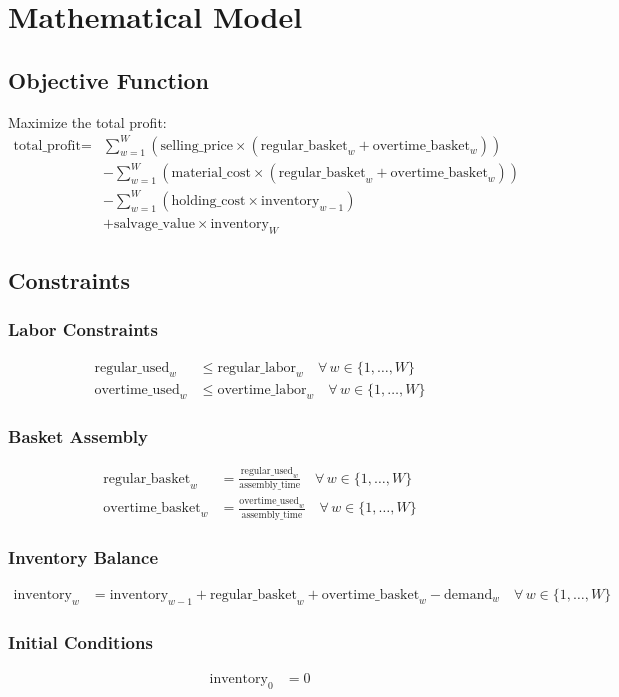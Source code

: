 \documentclass{article}
\begin{document}
\section*{Mathematical Model}

\subsection*{Objective Function}
Maximize the total profit:
\begin{align*}
\text{total\_profit} = & \sum_{w=1}^{W} \left( \text{selling\_price} \times (\text{regular\_basket}_w + \text{overtime\_basket}_w) \right) \\
& - \sum_{w=1}^{W} \left( \text{material\_cost} \times (\text{regular\_basket}_w + \text{overtime\_basket}_w) \right) \\
& - \sum_{w=1}^{W} \left( \text{holding\_cost} \times \text{inventory}_{w-1} \right) \\
& + \text{salvage\_value} \times \text{inventory}_W
\end{align*}

\subsection*{Constraints}

\subsubsection*{Labor Constraints}
\begin{align}
\text{regular\_used}_w & \leq \text{regular\_labor}_w \quad \forall \, w \in \{1, \ldots, W\} \\
\text{overtime\_used}_w & \leq \text{overtime\_labor}_w \quad \forall \, w \in \{1, \ldots, W\}
\end{align}

\subsubsection*{Basket Assembly}
\begin{align}
\text{regular\_basket}_w & = \frac{\text{regular\_used}_w}{\text{assembly\_time}} \quad \forall \, w \in \{1, \ldots, W\} \\
\text{overtime\_basket}_w & = \frac{\text{overtime\_used}_w}{\text{assembly\_time}} \quad \forall \, w \in \{1, \ldots, W\}
\end{align}

\subsubsection*{Inventory Balance}
\begin{align}
\text{inventory}_{w} & = \text{inventory}_{w-1} + \text{regular\_basket}_w + \text{overtime\_basket}_w - \text{demand}_{w} \quad \forall \, w \in \{1, \ldots, W\}
\end{align}

\subsubsection*{Initial Conditions}
\begin{align}
\text{inventory}_0 & = 0
\end{align}
\end{document}
